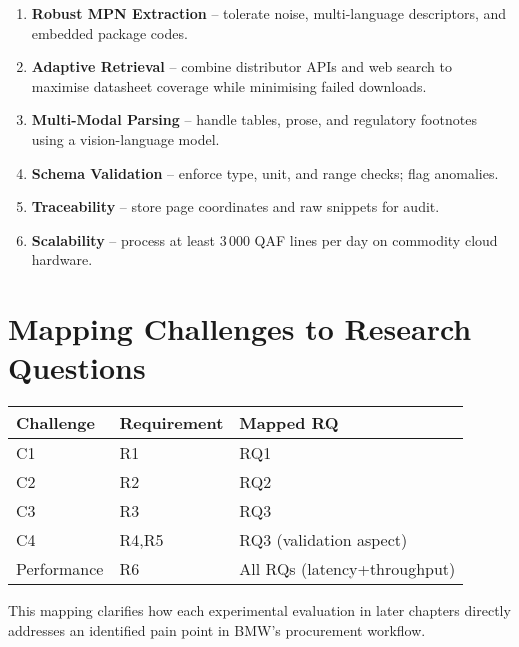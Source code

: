\begin{enumerate}
  \item \textbf{Robust MPN Extraction} – tolerate noise, multi-language descriptors, and embedded package codes.  
  \item \textbf{Adaptive Retrieval} – combine distributor APIs and web search to maximise datasheet coverage while minimising failed downloads.  
  \item \textbf{Multi-Modal Parsing} – handle tables, prose, and regulatory footnotes using a vision-language model.  
  \item \textbf{Schema Validation} – enforce type, unit, and range checks; flag anomalies.  
  \item \textbf{Traceability} – store page coordinates and raw snippets for audit.  
  \item \textbf{Scalability} – process at least 3\,000 QAF lines per day on commodity cloud hardware.  
\end{enumerate}


\section{Mapping Challenges to Research Questions}
\begin{center}
\begin{tabular}{lll}
\textbf{Challenge} & \textbf{Requirement} & \textbf{Mapped RQ} \\\hline
C1 & R1 & RQ1 \\
C2 & R2 & RQ2 \\
C3 & R3 & RQ3 \\
C4 & R4,\;R5 & RQ3 (validation aspect) \\
Performance & R6 & All RQs (latency+throughput) \\
\end{tabular}
\end{center}


This mapping clarifies how each experimental evaluation in later chapters directly addresses an identified pain point in BMW’s procurement workflow.
